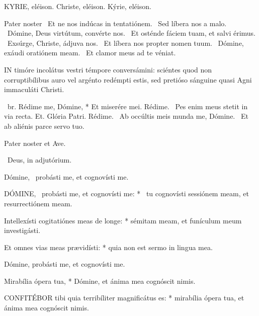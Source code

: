 KYRIE, eléison. Christe, eléison. Kýrie, eléison.

Pater noster  \V\ Et ne nos indúcas in tentatiónem. \R\ Sed líbera nos a malo. \V\ Dómine, Deus virtútum, convérte nos. \R\ Et osténde fáciem tuam, et salvi érimus. \V\ Exsúrge, Christe, ádjuva nos. \R\ Et líbera nos propter nomen tuum. \V\ Dómine, exáudi oratiónem meam. \R\ Et clamor meus ad te véniat.




\lettrine[lines=2]{I}{N} timóre incolátus vestri témpore conversámini: sciéntes quod non corruptibílibus auro vel argénto redémpti estis, sed pretióso sánguine quasi Agni immaculáti Christi.

\R\ br. Rédime me, Dómine, * Et miserére mei. Rédime. \V\ Pes enim meus stetit in via recta. Et. Glória Patri. Rédime. \V\ Ab occúltis meis munda me, Dómine. \R\ Et ab aliénis parce servo tuo.



\sectionornament


Pater noster et Ave.

\V\ Deus, in adjutórium.

 Dómine, \dag\ probásti me, et cognovísti me. \ddag


\lettrine[lines=2]{D}{ÓMINE}, \dag\ probásti me, et cognovísti me: * \ddag\ tu cognovísti sessiónem meam, et resurrectiónem meam.

Intellexísti cogitatiónes meas de longe: * sémitam meam, et funículum meum investigásti.

Et omnes vias meas prævidísti: * quia non est sermo in lingua mea.

 Dómine, probásti me, et cognovísti me.

 Mirabília ópera tua, * Dómine, et ánima mea cognóscit nimis.


\lettrine[lines=2]{C}{ONFITÉBOR} tibi quia terribíliter magnificátus es: * mirabília ópera tua, et ánima mea cognóscit nimis.

